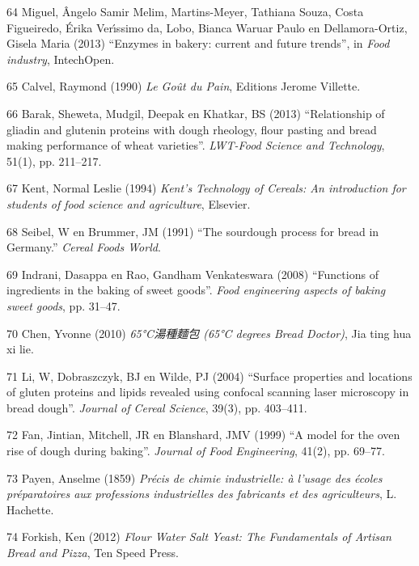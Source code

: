 \documentclass[
  11pt,
  dutch,
]{memoir}
\newlength{\cslhangindent}
\newenvironment{cslreferences}%
  {\setlength{\parindent}{0pt}%
  \everypar{\setlength{\hangindent}{\cslhangindent}}\ignorespaces}%
  {\par}
\begin{document}
\begin{cslreferences}
\leavevmode\hypertarget{ref-miguel2013enzymes}{}%
64 Miguel, Ângelo Samir Melim, Martins-Meyer, Tathiana Souza, Costa
Figueiredo, Érika Verı́ssimo da, Lobo, Bianca Waruar Paulo en
Dellamora-Ortiz, Gisela Maria (2013) ``Enzymes in bakery: current and
future trends'', in \emph{Food industry}, IntechOpen.

\leavevmode\hypertarget{ref-calvel}{}%
65 Calvel, Raymond (1990) \emph{Le Goût du Pain}, Editions Jerome
Villette.

\leavevmode\hypertarget{ref-barak2013relationship}{}%
66 Barak, Sheweta, Mudgil, Deepak en Khatkar, BS (2013) ``Relationship
of gliadin and glutenin proteins with dough rheology, flour pasting and
bread making performance of wheat varieties''. \emph{LWT-Food Science
and Technology}, 51(1), pp. 211--217.

\leavevmode\hypertarget{ref-kent1994kent}{}%
67 Kent, Normal Leslie (1994) \emph{Kent's Technology of Cereals: An
introduction for students of food science and agriculture}, Elsevier.

\leavevmode\hypertarget{ref-seibel1991sourdough}{}%
68 Seibel, W en Brummer, JM (1991) ``The sourdough process for bread in
Germany.'' \emph{Cereal Foods World}.

\leavevmode\hypertarget{ref-indrani2008functions}{}%
69 Indrani, Dasappa en Rao, Gandham Venkateswara (2008) ``Functions of
ingredients in the baking of sweet goods''. \emph{Food engineering
aspects of baking sweet goods}, pp. 31--47.

\leavevmode\hypertarget{ref-chen}{}%
70 Chen, Yvonne (2010) \emph{65°C湯種麵包 (65°C degrees Bread Doctor)},
Jia ting hua xi lie.

\leavevmode\hypertarget{ref-li2004surface}{}%
71 Li, W, Dobraszczyk, BJ en Wilde, PJ (2004) ``Surface properties and
locations of gluten proteins and lipids revealed using confocal scanning
laser microscopy in bread dough''. \emph{Journal of Cereal Science},
39(3), pp. 403--411.

\leavevmode\hypertarget{ref-fan1999model}{}%
72 Fan, Jintian, Mitchell, JR en Blanshard, JMV (1999) ``A model for the
oven rise of dough during baking''. \emph{Journal of Food Engineering},
41(2), pp. 69--77.

\leavevmode\hypertarget{ref-payen1859precis}{}%
73 Payen, Anselme (1859) \emph{Précis de chimie industrielle: à l'usage
des écoles préparatoires aux professions industrielles des fabricants et
des agriculteurs}, L. Hachette.

\leavevmode\hypertarget{ref-forkish}{}%
74 Forkish, Ken (2012) \emph{Flour Water Salt Yeast: The Fundamentals of
Artisan Bread and Pizza}, Ten Speed Press.


\end{cslreferences}
\end{document}

